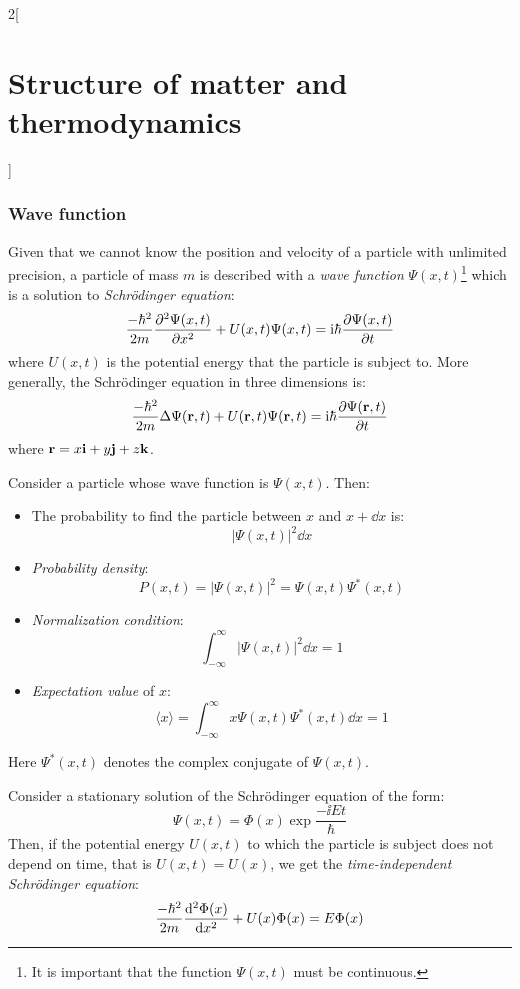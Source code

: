 \documentclass[../../../main_physics.tex]{subfiles}
\begin{document}
\begin{multicols}{2}[\section{Structure of matter and thermodynamics}]
  \subsubsection{Wave function}
  \begin{definition}
    Given that we cannot know the position and velocity of a particle with unlimited precision, a particle of mass $m$ is described with a \emph{wave function} $\Psi(x,t)$\footnote{It is important that the function $\Psi(x,t)$ must be continuous.} which is a solution to \emph{Schrödinger equation}:
    $$\frac{-\hbar^2}{2m}\pdv[2]{\Psi(x,t)}{x}+U(x,t)\Psi(x,t)=\mathrm{i}\hbar\pdv{\Psi(x,t)}{t}$$
    where $U(x,t)$ is the potential energy that the particle is subject to. More generally, the Schrödinger equation in three dimensions is:
    $$\frac{-\hbar^2}{2m}\Delta\Psi(\boldsymbol{\mathrm{r}},t)+U(\boldsymbol{\mathrm{r}},t)\Psi(\boldsymbol{\mathrm{r}},t)=\mathrm{i}\hbar\pdv{\Psi(\boldsymbol{\mathrm{r}},t)}{t}$$ where $\boldsymbol{\mathrm{r}}=x\boldsymbol{\mathrm{i}}+y\boldsymbol{\mathrm{j}}+z\boldsymbol{\mathrm{k}}$.
  \end{definition}
  \begin{proposition}
    Consider a particle whose wave function is $\Psi(x,t)$. Then:
    \begin{itemize}
      \item The probability to find the particle between $x$ and $x+\dd{x}$ is: $$|\Psi(x,t)|^2\dd{x}$$
      \item \emph{Probability density}: $$P(x,t)=|\Psi(x,t)|^2=\Psi(x,t)\Psi^*(x,t)$$
      \item \emph{Normalization condition}: $$\int_{-\infty}^\infty|\Psi(x,t)|^2\dd{x}=1$$
      \item \emph{Expectation value} of $x$: $$\langle x\rangle=\int_{-\infty}^\infty x\Psi(x,t)\Psi^*(x,t)\dd{x}=1$$
    \end{itemize}
    Here $\Psi^*(x,t)$ denotes the complex conjugate of $\Psi(x,t)$.
  \end{proposition}
  \begin{definition}
    Consider a stationary solution of the Schrö\-din\-ger equation of the form: $$\Psi(x,t)=\Phi(x)\exp{\frac{-\ii Et}{\hbar}}$$
    Then, if the potential energy $U(x,t)$ to which the particle is subject does not depend on time, that is $U(x,t)=U(x)$, we get the \emph{time-independent Schrödinger equation}:
    \begin{equation}\label{SMT_schrodinger}
      \frac{-\hbar^2}{2m}\dv[2]{\Phi(x)}{x}+U(x)\Phi(x)=E\Phi(x)
    \end{equation}

\end{definition}
\end{multicols}
\end{document}
